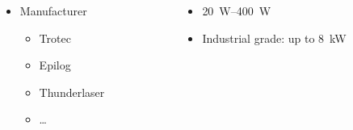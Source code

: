 \documentclass[aspectratio=169]{beamer}
\begin{document}
\begin{frame}
    \begin{columns}
        \begin{column}[t]{0.5\textwidth}
            \begin{itemize}
                \item Manufacturer
                      \begin{itemize}
                          \item Trotec
                          \item Epilog
                          \item Thunderlaser
                          \item \ldots
                      \end{itemize}
            \end{itemize}
        \end{column}
        \begin{column}[t]{0.5\textwidth}
            \begin{itemize}
                \item \SIrange{20}{400}{\watt}
                \item Industrial grade: up to \SI{8}{\kilo\watt}
            \end{itemize}
        \end{column}
    \end{columns}
    \begin{columns}
        \begin{column}{0.5\textwidth}
            \begin{figure}

\end{figure}
\end{column}
\end{columns}
\end{frame}
\end{document}
